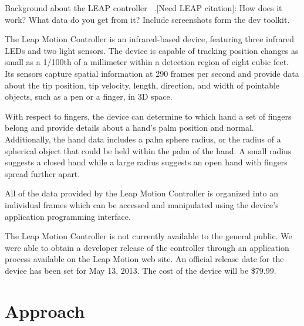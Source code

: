 \documentclass[review]{acmsiggraph}
\begin{document}
Background about the LEAP controller ~\cite{LEA}.[Need LEAP citation]: How does it work? What data 
do you get from it?  Include screenshots form the dev toolkit.

The Leap Motion Controller is an infrared-based device, featuring three infrared LEDs and two light sensors. The device is capable of tracking position changes as small as a 1/100th of a millimeter within a detection region of eight cubic feet. Its sensors capture spatial information at 290 frames per second and provide data about the tip position, tip velocity, length, direction, and width of pointable objects, such as a pen or a finger, in 3D space. 

With respect to fingers, the device can determine to which hand a set of fingers belong and provide details about a hand's palm position and normal. Additionally, the hand data includes a palm sphere radius, or the radius of a spherical object that could be held within the palm of the hand. A small radius suggests a closed hand while a large radius suggests an open hand with fingers spread further apart.  

All of the data provided by the Leap Motion Controller is organized into an individual frames which can be accessed and manipulated using the device's application programming interface.

The Leap Motion Controller is not currently available to the general public. We were able to obtain a developer release of the controller through an application process available on the Leap Motion web site.  An official release date for the device has been set for May 13, 2013. The cost of the device will be  \$79.99. 



\section{Approach}
\end{document}
